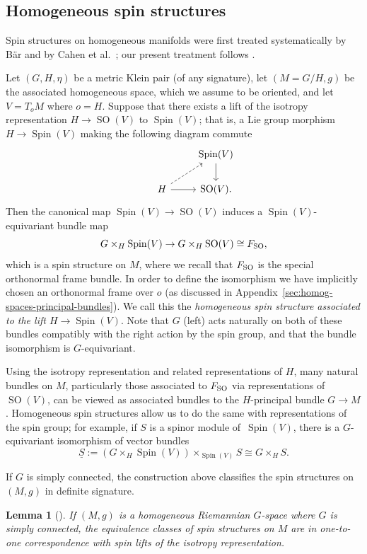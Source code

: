 \documentclass[pdftex]{sigma}
\numberwithin{equation}{section}
\newtheorem{Lemma}[Theorem]{Lemma}
\newcommand{\Sbundle}{\underline{S}}
\newcommand{\1}{\mathbbm{1}}
\DeclareMathOperator{\Spin}{Spin}
\DeclareMathOperator{\SO}{SO}
\begin{document}
\subsection{Homogeneous spin structures}
\label{sec:homogeneous-spin-mfld}

Spin structures on homogeneous manifolds were first treated systematically by B\"ar \cite{Bar1992} and by Cahen et al.\ \cite{Cahen1993}; our present treatment follows \cite{Figueroa-OFarrill2017_1}.

Let $(G,H,\eta)$ be a metric Klein pair (of any signature), let $(M=G/H,g)$ be the associated homogeneous space, which we assume to be oriented, and let $V=T_oM$ where $o=H$. Suppose that there exists a lift of the isotropy representation $H\to\SO(V)$ to $\Spin(V)$; that is, a Lie group morphism $H\to\Spin(V)$ making the following diagram commute
\[
\begin{tikzcd}
	&	& \Spin(V) \ar[d]	\\
	& H	\ar[r] \ar[ur,dashed]& \SO(V).
\end{tikzcd}
\]
Then the canonical map $\Spin(V)\to\SO(V)$ induces a $\Spin(V)$-equivariant bundle map
\[
	G\times_H\Spin(V)\to G\times_H\SO(V) \cong F_{\rm SO},
\]
which is a spin structure on $M$, where we recall that $F_{\rm SO}$ is the special orthonormal frame bundle. In order to define the isomorphism we have implicitly chosen an orthonormal frame over $o$ (as discussed in Appendix~\ref{sec:homog-spaces-principal-bundles}). We call this the \emph{homogeneous spin structure associated to the lift $H\to\Spin(V)$}. Note that $G$ (left) acts naturally on both of these bundles compatibly with the right action by the spin group, and that the bundle isomorphism is $G$-equivariant.

Using the isotropy representation and related representations of $H$, many natural bundles on $M$, particularly those associated to $F_{\rm SO}$ via representations of $\SO(V)$, can be viewed as associated bundles to the $H$-principal bundle $G\to M$. Homogeneous spin structures allow us to do the same with representations of the spin group; for example, if $S$ is a spinor module of~$\Spin(V)$, there is a $G$-equivariant isomorphism of vector bundles
\[
	\Sbundle := (G\times_H\Spin(V))\times_{\Spin(V)} S \cong G\times_H S.
\]

If $G$ is simply connected, the construction above classifies the spin structures on $(M,g)$ in definite signature.

\begin{Lemma}[\cite{Bar1992,Cahen1993}]\label{lemma:homogeneous-spin}
	If $(M,g)$ is a homogeneous Riemannian $G$-space where $G$ is simply connected, the equivalence classes of spin structures on $M$ are in one-to-one correspondence with spin lifts of the isotropy representation.
\end{Lemma}
\end{document}
